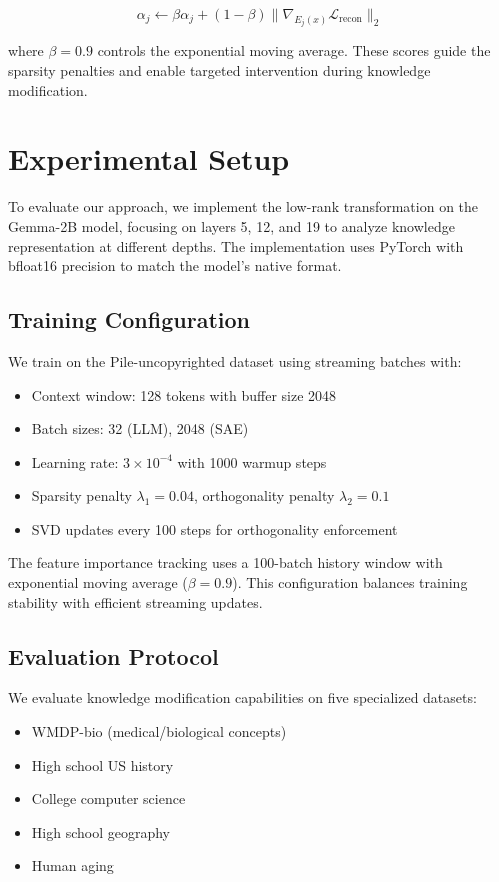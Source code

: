 \documentclass{article} %
\begin{document}
\begin{equation}
    \alpha_j \leftarrow \beta\alpha_j + (1-\beta)\|\nabla_{E_j(x)}\mathcal{L}_{\text{recon}}\|_2
\end{equation}

where $\beta=0.9$ controls the exponential moving average. These scores guide the sparsity penalties and enable targeted intervention during knowledge modification.

\section{Experimental Setup}
\label{sec:experimental}

To evaluate our approach, we implement the low-rank transformation on the Gemma-2B model, focusing on layers 5, 12, and 19 to analyze knowledge representation at different depths. The implementation uses PyTorch \cite{paszke2019pytorch} with bfloat16 precision to match the model's native format.

\subsection{Training Configuration}
We train on the Pile-uncopyrighted dataset \cite{radford2019language} using streaming batches with:
\begin{itemize}
    \item Context window: 128 tokens with buffer size 2048
    \item Batch sizes: 32 (LLM), 2048 (SAE)
    \item Learning rate: $3 \times 10^{-4}$ with 1000 warmup steps
    \item Sparsity penalty $\lambda_1 = 0.04$, orthogonality penalty $\lambda_2 = 0.1$
    \item SVD updates every 100 steps for orthogonality enforcement
\end{itemize}

The feature importance tracking uses a 100-batch history window with exponential moving average ($\beta = 0.9$). This configuration balances training stability with efficient streaming updates.

\subsection{Evaluation Protocol}
We evaluate knowledge modification capabilities on five specialized datasets:
\begin{itemize}
    \item WMDP-bio (medical/biological concepts)
    \item High school US history
    \item College computer science
    \item High school geography
    \item Human aging
\end{itemize}
\end{document}
